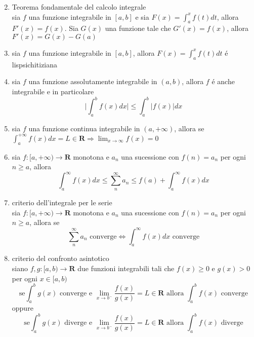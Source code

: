 \documentclass{exam}
\begin{document}
\begin{enumerate}
\begin{equation}
				\end{equation}
			\item{Teorema fondamentale del calcolo integrale}\\
				sia $f$ una funzione integrabile in $[a,b]$ e sia \(\displaystyle F(x)=\int_a^x f(t)dt \), allora $F'(x)=f(x)$.
				Sia $G(x)$ una funzione tale che $G'(x)=f(x)$, allora $F'(x)=G(x)-G(a)$
			\item
				sia $f$ una funzione integrabile in $[a,b]$, allora \(\displaystyle F(x)=\int_a^x f(t)dt \) \'e lispsichitiziana
			\item
				sia $f$ una funzione assolutamente integrabile in $(a,b)$, allora $f$ \'e anche integrabile e in particolare
				\begin{equation}
					\bigg|\int_a^b f(x)dx\bigg|\le \int_a^b|f(x)|dx
				\end{equation}
			\item
				sia $f$ una funzione continua integrabile in $(a,+\infty)$, allora se \(\displaystyle \int_a^{+\infty}f(x)dx=L\in\mathbf{R}\Rightarrow \lim_{x\to\infty}f(x)=0\) 
			\item
				sia $f:[a,+\infty)\rightarrow\mathbf{R}$ monotona e $a_n$ una sucessione con $f(n)=a_n$ per ogni $n\geq a$, allora
				\begin{equation}
					\int_a^\infty f(x)dx	\le \sum_n^\infty a_n \le f(a)+ \int_a^\infty f(x)dx 
				\end{equation}
			\item{criterio dell'integrale per le serie}\\
				sia $f:[a,+\infty)\rightarrow\mathbf{R}$ monotona e $a_n$ una sucessione con $f(n)=a_n$ per ogni $n\geq a$, allora se
				\begin{equation}
					\sum_n^\infty a_n \textrm{ converge}\Leftrightarrow \int_a^\infty f(x)dx \textrm{ converge}
				\end{equation}
      \item{criterio del confronto asintotico}\\
        siano $f,g:[a,b)\rightarrow\mathbf{R}$ due funzioni integrabili tali che $f(x)\geq 0$ e $g(x)>0$ per ogni $x\in [a,b)$
        \begin{equation}
          \textrm{se} \int_a^b g(x) \textrm{ converge e } \lim_{x\to b^-}\frac{f(x)}{g(x)}=L\in \mathbf{R} \textrm{ allora }\int_a^b f(x) \textrm{ converge}
        \end{equation}
        oppure
        \begin{equation}
          \textrm{se} \int_a^b g(x) \textrm{ diverge e } \lim_{x\to b^-}\frac{f(x)}{g(x)}=L\in \mathbf{R} \textrm{ allora }\int_a^b f(x) \textrm{ diverge}
        \end{equation}

		\end{enumerate}
\end{document}
